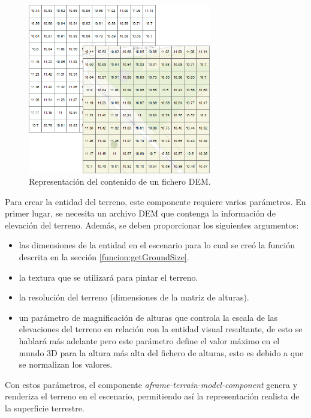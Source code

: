 \documentclass[a4paper, 11pt]{book}
\begin{document}
\begin{figure}[h]
  \centering
  \includegraphics[width=8cm, keepaspectratio]{img/dem.png}
  \caption{Representación del contenido de un fichero DEM.}
  \label{fig:dem}
\end{figure}

Para crear la entidad del terreno, este componente requiere varios parámetros. En primer lugar, se necesita un archivo DEM que contenga la información de elevación del terreno. Además, se deben proporcionar los siguientes argumentos:
\begin{itemize}
	\item las dimensiones de la entidad en el escenario para lo cual se creó la función descrita en la sección \ref{funcion:getGroundSize}.
	\item la textura que se utilizará para pintar el terreno.
	\item la resolución del terreno (dimensiones de la matriz de alturas).
	\item un parámetro de magnificación de alturas que controla la escala de las elevaciones del terreno en relación con la entidad visual resultante, de esto se hablará más adelante pero este parámetro define el valor máximo en el mundo 3D para la altura más alta del fichero de alturas, esto es debido a que se normalizan los valores.
\end{itemize}
Con estos parámetros, el componente \emph{aframe-terrain-model-component} genera y renderiza el terreno en el escenario, permitiendo así la representación realista de la superficie terrestre.
\end{document}

